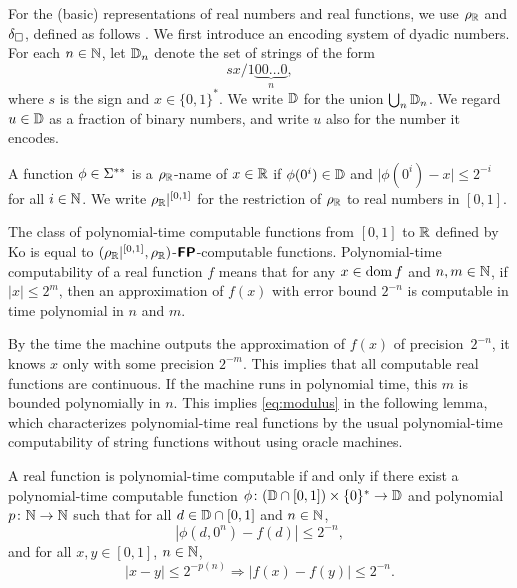 \documentclass[envcountsame,orivec,oribibl]{llncs}
\begin{document}
For the (basic) representations of real numbers and real functions,
we use $\rho _\mathbb R$ and $\delta _\square$, 
defined as follows \cite{kawamura2012complexity}.
We first introduce an encoding system of dyadic numbers.
For each $n \in \mathbb N$, let $\mathbb D_n$ denote the set of strings of the form
\begin{equation}
 sx/1\!\underbrace{00\dots0}_{n},
\end{equation}
where $s$ is the sign and $x \in \{0,1\}^*$.
We write $\mathbb D$ for the union $\bigcup _n \mathbb D _n$.
We regard $u \in \mathbb D$ as a fraction of binary numbers, 
and write $u$ also for the number it encodes. 

A function $\phi \in \Sigma ^{**}$ is a $\rho _\mathbb R$-name of $x \in \mathbb R$ 
if $\phi(0^i) \in \mathbb D$ and $\lvert \phi(0^i) - x \rvert \le 2^{-i}$
for all $i \in \mathbb N$.
We write $\rho _\mathbb R|^{[0,1]}$ for the restriction of $\rho _\mathbb R$ to real numbers in $[0,1]$.

The class of polynomial-time computable functions from $[0,1]$ to $\mathbb R$ 
defined by Ko is equal to
$(\rho _\mathbb R|^{[0,1]},\rho _\mathbb R)$-$\text{\bfseries \sffamily \upshape FP}$-computable functions.
Polynomial-time computability of a real function $f$ means that
for any $x \in \mathop{\rm dom} f$ and $n,m \in \mathbb N$, 
if $|x| \le 2^m$, then
an approximation of $f(x)$ with error bound $2^{-n}$
is computable in time polynomial in $n$ and $m$.

By the time the machine outputs the approximation of $f (x)$ of precision~$2 ^{-n}$, 
it knows $x$ only with some precision $2 ^{-m}$.
This implies that all computable real functions are continuous.
If the machine runs in polynomial time,
this $m$ is bounded polynomially in $n$.
This implies \eqref{eq:modulus} in the following lemma, 
which characterizes polynomial-time real functions
by the usual polynomial-time computability of string functions 
without using oracle machines. 

\begin{lemma}
 \label{lem:type1representation}
 A real function is polynomial-time computable if and only if
 there exist a polynomial-time computable function 
 $\phi \colon (\mathbb D \cap [0, 1]) \times \{0\} ^* \to \mathbb D$ and 
 polynomial $p \colon \mathbb N \to \mathbb N$ such that
 for all $d \in \mathbb D \cap [0,1]$ and $n \in \mathbb N$,
 \begin{equation}
   \label{eq:computation on rational points}
  |\phi(d, 0^n) - f(d)| \le 2^{-n},
 \end{equation}
 and for all $x, y \in [0, 1]$, $n \in \mathbb N$,
 \begin{equation} 
  |x-y| \le 2^{-p(n)} \Rightarrow |f(x) - f(y)| \le 2^{-n}.
   \label{eq:modulus}
 \end{equation}
\end{lemma}
\end{document}
